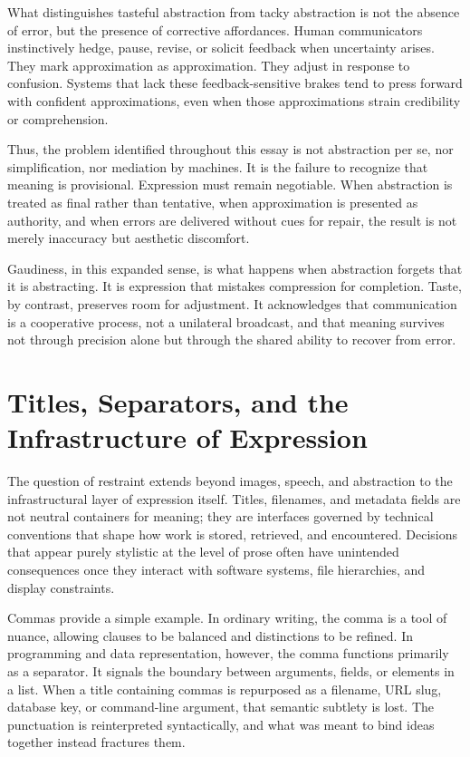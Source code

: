 \documentclass[12pt]{article}
\begin{document}
What distinguishes tasteful abstraction from tacky abstraction is not the absence of error, but the presence of corrective affordances. Human communicators instinctively hedge, pause, revise, or solicit feedback when uncertainty arises. They mark approximation as approximation. They adjust in response to confusion. Systems that lack these feedback-sensitive brakes tend to press forward with confident approximations, even when those approximations strain credibility or comprehension.

Thus, the problem identified throughout this essay is not abstraction per se, nor simplification, nor mediation by machines. It is the failure to recognize that meaning is provisional. Expression must remain negotiable. When abstraction is treated as final rather than tentative, when approximation is presented as authority, and when errors are delivered without cues for repair, the result is not merely inaccuracy but aesthetic discomfort.

Gaudiness, in this expanded sense, is what happens when abstraction forgets that it is abstracting. It is expression that mistakes compression for completion. Taste, by contrast, preserves room for adjustment. It acknowledges that communication is a cooperative process, not a unilateral broadcast, and that meaning survives not through precision alone but through the shared ability to recover from error.

\section{Titles, Separators, and the Infrastructure of Expression}

The question of restraint extends beyond images, speech, and abstraction to the infrastructural layer of expression itself. Titles, filenames, and metadata fields are not neutral containers for meaning; they are interfaces governed by technical conventions that shape how work is stored, retrieved, and encountered. Decisions that appear purely stylistic at the level of prose often have unintended consequences once they interact with software systems, file hierarchies, and display constraints.

Commas provide a simple example. In ordinary writing, the comma is a tool of nuance, allowing clauses to be balanced and distinctions to be refined. In programming and data representation, however, the comma functions primarily as a separator. It signals the boundary between arguments, fields, or elements in a list. When a title containing commas is repurposed as a filename, URL slug, database key, or command-line argument, that semantic subtlety is lost. The punctuation is reinterpreted syntactically, and what was meant to bind ideas together instead fractures them.
\end{document}
